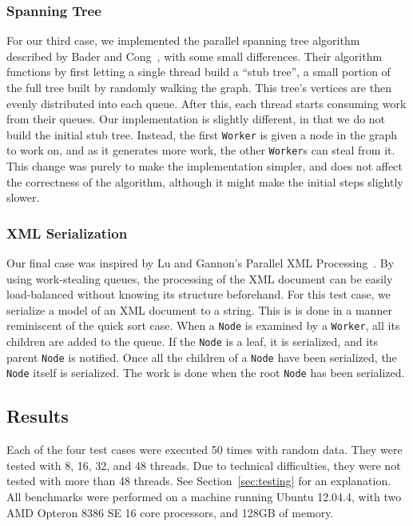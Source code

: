 \subsubsection{Spanning Tree} %
For our third case, we implemented the parallel spanning tree algorithm
described by Bader and Cong~\cite{Bader04afast}, with some small differences.
Their algorithm functions by first letting a single thread build a ``stub
tree'', a small portion of the full tree built by randomly walking the graph.
This tree's vertices are then evenly distributed into each queue. After this,
each thread starts consuming work from their queues. Our implementation is
slightly different, in that we do not build the initial stub tree. Instead, the
first \texttt{Worker} is given a node in the graph to work on, and as it
generates more work, the other \texttt{Worker}s can steal from it. This change
was purely to make the implementation simpler, and does not affect the
correctness of the algorithm, although it might make the initial steps slightly
slower.

\subsubsection{XML Serialization} %
Our final case was inspired by Lu and Gannon's Parallel XML
Processing~\cite{Lu:2007:PXP:1272457.1272462}. By using work-stealing queues,
the processing of the XML document can be easily load-balanced without knowing
its structure beforehand. For this test case, we serialize a model of an XML
document to a string. This is is done in a manner reminiscent of the quick sort
case. When a \texttt{Node} is examined by a \texttt{Worker}, all its children
are added to the queue. If the \texttt{Node} is a leaf, it is serialized, and
its parent \texttt{Node} is notified. Once all the children of a \texttt{Node}
have been serialized, the \texttt{Node} itself is serialized. The work is done
when the root \texttt{Node} has been serialized.

\subsection{Results}
Each of the four test cases were executed 50 times with random data. They were
tested with 8, 16, 32, and 48 threads. Due to technical difficulties, they were
not tested with more than 48 threads. See Section~\ref{sec:testing} for an
explanation. All benchmarks were performed on a machine running 
Ubuntu 12.04.4, with two AMD Opteron 8386 SE 16 core processors, and 128GB of
memory.

